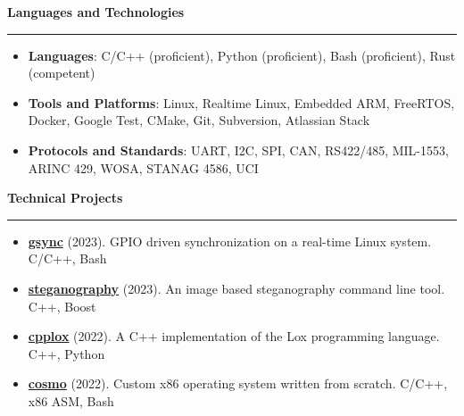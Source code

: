 \documentclass[11pt,letterpaper]{article}
\begin{document}
\medskip

\begin{large}
	\textbf{Languages and Technologies}
\end{large}

\smallskip \hrule \medskip

\begin{itemize}[topsep=0pt]
	\setlength\itemsep{0.2em}
	\item \textbf{Languages}: C/C++ (proficient),
	      Python (proficient),
	      Bash (proficient),
	      Rust (competent)
	\item \textbf{Tools and Platforms}: Linux,
	      Realtime Linux,
	      Embedded ARM,
	      FreeRTOS,
	      Docker,
	      Google Test,
	      CMake,
	      Git,
	      Subversion,
	      Atlassian Stack
	\item \textbf{Protocols and Standards}: UART,
	      I2C,
	      SPI,
	      CAN,
	      RS422/485,
	      MIL-1553,
	      ARINC 429,
	      WOSA,
	      STANAG 4586,
	      UCI
\end{itemize}

\medskip

\begin{large}
	\textbf{Technical Projects}
\end{large}

\smallskip \hrule \medskip

\begin{itemize}[topsep=0pt]
	\setlength\itemsep{0.2em}
	\item \textbf{\href{https://github.com/ivan-guerra/gsync.git}{gsync}}
	      (2023). GPIO driven synchronization on a real-time Linux system. C/C++,
	      Bash
	\item \textbf{\href{https://github.com/ivan-guerra/steganography.git}{steganography}}
	      (2023). An image based steganography command line tool. C++, Boost
	\item \textbf{\href{https://github.com/ivan-guerra/cpplox.git}{cpplox}}
	      (2022). A C++ implementation of the Lox programming language. C++,
	      Python
	\item \textbf{
		      \href{https://github.com/ivan-guerra/cosmo.git}{cosmo}}
	      (2022). Custom x86 operating system written from scratch. C/C++, x86
	      ASM, Bash
\end{itemize}
\end{document}
